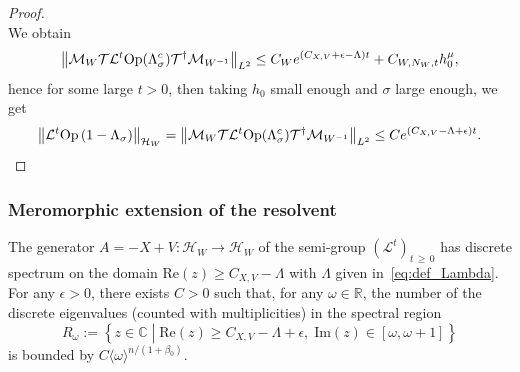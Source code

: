 \documentclass[AHL,Unicode,longabstracts,published]{cedram}
\newcommand{\clT}{\mathcal{T}}
\newcommand{\clH}{\mathcal{H}}
\newcommand{\clL}{\mathcal{L}}
\newcommand{\clM}{\mathcal{M}}
\newcommand{\Ree}{\mathrm{Re}}
\newcommand{\Imm}{\mathrm{Im}}
\newcommand{\Opp}{\mathrm{Op}}
\newcommand{\bbR}{\mathbb{R}}
\newcommand{\bbC}{\mathbb{C}}
\newcommand{\Imm}{\mathrm{Im}}
\newcommand{\Ree}{\mathrm{Re}}
\newcommand{\clH}{\mathcal{H}}
\newcommand{\bbR}{\mathbb{R}}
\begin{document}
\begin{proof}
\[\]
We obtain
\[
\left\Vert \clM_{W}\text{\ensuremath{\clT}\ensuremath{\clL^{t}}\textrm{Op}\ensuremath{\left(\Lambda_{\sigma}^{c}\right)}\ensuremath{\ensuremath{\clT^{\dagger}}}}\clM_{W^{-1}}\right\Vert _{L^{2}}\le C_{W}e^{(C_{X,V}+\epsilon-\Lambda)t}+C_{W,N_{W},t}h_{0}^{\mu},
\]
hence for some large $t>0$, then taking $h_{0}$ small enough and $\sigma$ large enough, we get
\[
\left\Vert \clL^{t}\Opp \left(1-\Lambda_{\sigma}\right)\right\Vert _{\clH _{W}}=\left\Vert \clM_{W}\text{\ensuremath{\clT}\ensuremath{\clL^{t}}\textrm{Op}\ensuremath{\left(\Lambda_{\sigma}^{c}\right)}\ensuremath{\ensuremath{\clT^{\dagger}}}}\clM_{W^{-1}}\right\Vert _{L^{2}}\le Ce^{(C_{X,V}-\Lambda+\epsilon)t}.\qedhere
\]
\end{proof}

\subsubsection{Meromorphic extension of the resolvent}

\begin{cBoxB}{}
\begin{prop}\label{prop:discrete_spectrum}
The generator $A=-X+V:\clH _{W}\rightarrow\clH _{W}$ of the semi-group $(\clL^{t})_{t\,\geq\,0}$ has discrete spectrum on the domain $\Ree(z)\geq C_{X,V}-\Lambda$ with $\Lambda$ given in~\eqref{eq:def_Lambda}. For any $\epsilon>0$, there exists $C>0$ such that, for any $\omega\in\bbR$, the number of the discrete eigenvalues (counted with multiplicities) in the spectral region
\begin{equation}\label{eq:def_region_R}
R_{\omega}:=\left\{ z\in\bbC\;\left|\;\Ree\left(z\right)\geq C_{X,V}-\Lambda+\epsilon,\;\Imm(z)\in\left[\omega,\omega+1\right]\right.\right\} 
\end{equation}
is bounded by $C\langle \omega\rangle ^{n/(1+\beta_{0})}$.
\end{prop}
\end{cBoxB}
\end{document}
